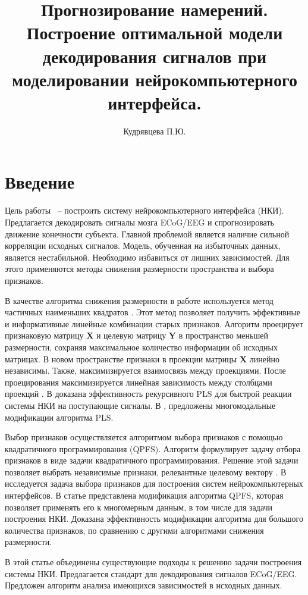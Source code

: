 \documentclass[12pt,twoside]{article}
\title
    [Построение оптимальной системы нейрокомпьютерного интерфейса]
    {Прогнозирование намерений. Построение оптимальной модели декодирования сигналов при моделировании нейрокомпьютерного интерфейса.}
\author {Кудрявцева П.Ю.} %
\begin{document}
\maketitle



\section{Введение}
 Цель работы ~-- построить систему нейрокомпьютерного интерфейса (НКИ). Предлагается декодировать сигналы мозга ECoG/EEG и спрогнозировать движение конечности субъекта. Главной проблемой  является наличие сильной корреляции исходных сигналов. Модель, обученная на избыточных данных, является нестабильной. Необходимо избавиться от лишних зависимостей. Для этого применяются методы снижения размерности пространства и выбора признаков.
 
 В качестве алгоритма снижения размерности в работе используется метод частичных наименьших квадратов \cite{pls_effective}. Этот метод позволяет получить эффективные и информативные линейные комбинации старых признаков. Алгоритм проецирует признаковую матрицу  \textbf{X}  и целевую матрицу  \textbf{Y}  в пространство меньшей размерности, сохраняя максимальное количество информации об исходных матрицах. В новом пространстве признаки в проекции матрицы \textbf{X} линейно независимы. Также, максимизируется взаимосвязь между проекциями. После проецирования максимизируется линейная зависимость между столбцами проекций \cite{pls_ni}. В \cite{elisey} доказана эффективность рекурсивного PLS для быстрой реакции системы НКИ на поступающие сигналы. В \cite{elisey2}, \cite{elisey3}  предложены многомодальные модификации алгоритма PLS. 
 
 Выбор признаков осуществляется алгоритмом выбора признаков с помощью квадратичного программирования (QPFS). Алгоритм формулирует задачу отбора признаков в виде задачи квадратичного программирования. Решение этой задачи позволяет выбрать независимые признаки, релевантные целевому вектору \cite{qpfc}. В \cite{motrenko} исследуется задача выбора признаков для построения систем нейрокомпьютерных интерфейсов. В статье представлена модификация алгоритма QPFS, которая позволяет применять его к многомерным данным, в том числе для задачи построения НКИ. Доказана эффективность модификации алгоритма для большого количества признаков, по сравнению с другими алгоритмами снижения размерности.
 
 В этой статье объединены существующие подходы к решению задачи построения системы НКИ. Предлагается стандарт для декодирования сигналов ECoG/EEG. Предложен алгоритм анализа имеющихся зависимостей в исходных данных. 
\end{document}
